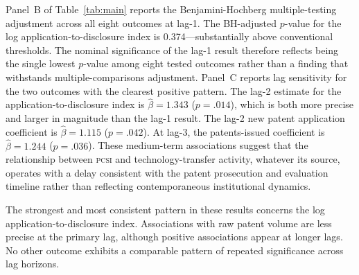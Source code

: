 \documentclass[12pt]{article}
\newcommand{\PCSI}{\textsc{pcsi}}
\begin{document}
Panel~B of Table~\ref{tab:main} reports the Benjamini-Hochberg multiple-testing
adjustment across all eight outcomes at lag-1. The BH-adjusted $p$-value for the log
application-to-disclosure index is 0.374---substantially above conventional thresholds.
The nominal significance of the lag-1 result therefore reflects being the single
lowest $p$-value among eight tested outcomes rather than a finding that withstands
multiple-comparisons adjustment. Panel~C reports lag sensitivity for the two outcomes
with the clearest positive pattern. The lag-2 estimate for the application-to-disclosure
index is $\hat\beta = 1.343$ ($p = .014$), which is both more precise and larger in
magnitude than the lag-1 result. The lag-2 new patent application coefficient is
$\hat\beta = 1.115$ ($p = .042$). At lag-3, the patents-issued coefficient is
$\hat\beta = 1.244$ ($p = .036$). These medium-term associations suggest that the
relationship between \PCSI{} and technology-transfer activity, whatever its source,
operates with a delay consistent with the patent prosecution and evaluation timeline
rather than reflecting contemporaneous institutional dynamics.

The strongest and most consistent pattern in these results concerns the log
application-to-disclosure index. Associations with raw patent volume are less precise
at the primary lag, although positive associations appear at longer lags. No other outcome
exhibits a comparable pattern of repeated significance across lag horizons.
\end{document}
